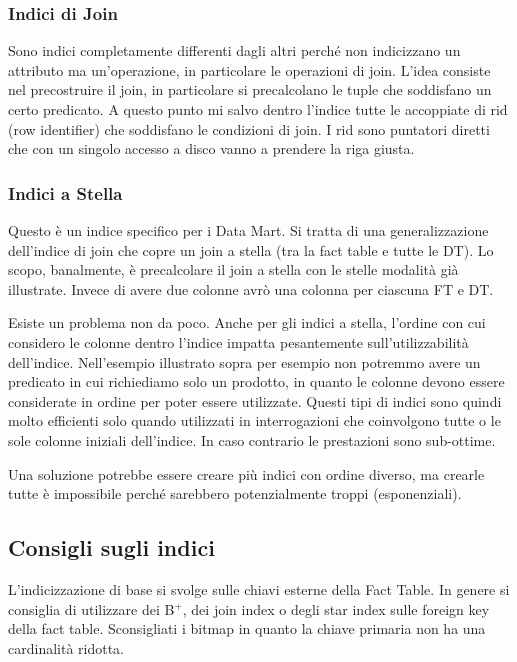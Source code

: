 \subsubsection{Indici di Join}
Sono indici completamente differenti dagli altri perché non indicizzano un attributo ma un'operazione, in particolare le operazioni di join. L'idea consiste nel precostruire il join, in particolare si precalcolano le tuple che soddisfano un certo predicato. A questo punto mi salvo dentro l'indice tutte le accoppiate di rid (row identifier) che soddisfano le condizioni di join. I rid sono puntatori diretti che con un singolo accesso a disco vanno a prendere la riga giusta.


\subsubsection{Indici a Stella}
Questo è un indice specifico per i Data Mart. Si tratta di una generalizzazione dell'indice di join che copre un join a stella (tra la fact table e tutte le DT). Lo scopo, banalmente, è precalcolare il join a stella con le stelle modalità già illustrate. Invece di avere due colonne avrò una colonna per ciascuna FT e DT.

\noindent Esiste un problema non da poco. Anche per gli indici a stella, l'ordine con cui considero le colonne dentro l'indice impatta pesantemente sull'utilizzabilità dell'indice. Nell'esempio illustrato sopra per esempio non potremmo avere un predicato in cui richiediamo solo un prodotto, in quanto le colonne devono essere considerate in ordine per poter essere utilizzate. Questi tipi di indici sono quindi molto efficienti solo quando utilizzati in interrogazioni che coinvolgono tutte o le sole colonne iniziali dell'indice. In caso contrario le prestazioni sono sub-ottime.

\noindent Una soluzione potrebbe essere creare più indici con ordine diverso, ma crearle tutte è impossibile perché sarebbero potenzialmente troppi (esponenziali).

\subsection{Consigli sugli indici}
L'indicizzazione di base si svolge sulle chiavi esterne della Fact Table.
\noindent In genere si consiglia di utilizzare dei B$^{+}$, dei join index o degli star index sulle foreign key della fact table. Sconsigliati i bitmap in quanto la chiave primaria non ha una cardinalità ridotta.

